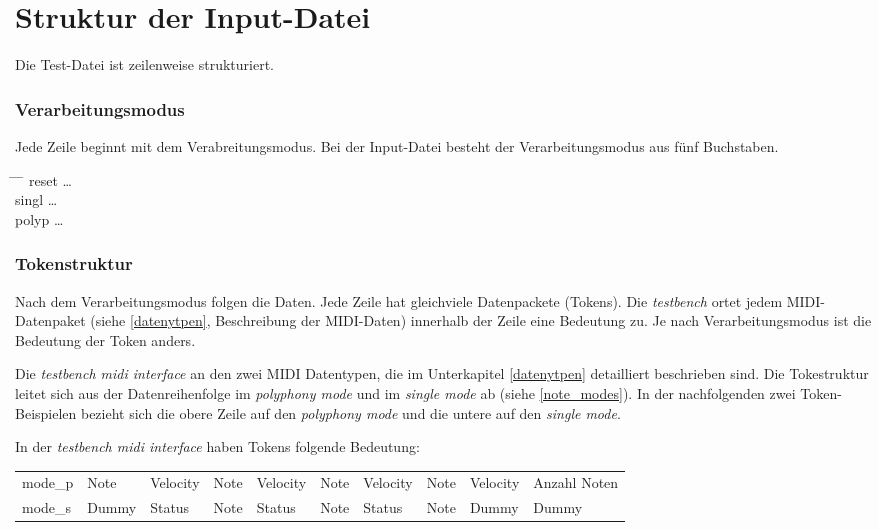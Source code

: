 \section{Struktur der Input-Datei}\label{sec.testbench_inputdatei} 

Die Test-Datei ist zeilenweise strukturiert.

\subsubsection{Verarbeitungsmodus} 
Jede Zeile beginnt mit dem Verabreitungsmodus. Bei der Input-Datei besteht der Verarbeitungsmodus aus fünf Buchstaben.

\begin{tabbing}
\hspace{4em} \= \hspace{2em} \= \hspace{2em} \=\kill
reset	  \> \ldots{}\\
singl	  \> \ldots{}\\
polyp	  \> \ldots{}
\end{tabbing}

\subsubsection{Tokenstruktur} 

Nach dem Verarbeitungsmodus folgen die Daten. Jede Zeile hat gleichviele Datenpackete (Tokens). 
Die \textit{testbench} ortet jedem MIDI-Datenpaket (siehe \ref {datenytpen}, Beschreibung der MIDI-Daten) innerhalb der Zeile eine Bedeutung zu. Je nach Verarbeitungsmodus ist die Bedeutung der Token anders.

Die \textit{testbench midi interface} an den zwei MIDI Datentypen, die im Unterkapitel \ref{datenytpen} detailliert beschrieben sind. Die Tokestruktur leitet sich aus der Datenreihenfolge im \textit{polyphony mode} und im \textit{single mode} ab (siehe  \ref{note_modes}). In der nachfolgenden zwei Token-Beispielen bezieht sich die obere Zeile auf den \textit{polyphony mode} und die untere auf den \textit{single mode}.

In der \textit{testbench midi interface} haben Tokens folgende Bedeutung:


{
\renewcommand{\arraystretch}{1.0} %
\begin{tabular}{@{}*{10}{l}@{}} %
mode\_p	& Note & Velocity	& Note & Velocity & Note & Velocity & Note & Velocity & Anzahl Noten \\
mode\_s	& Dummy & Status & Note & Status & Note & Status & Note & Dummy & Dummy
\end{tabular}
}


